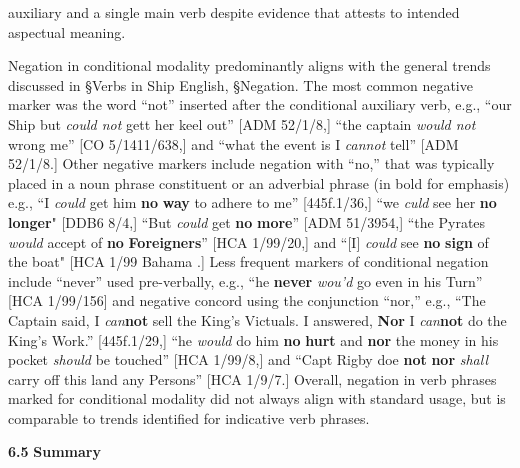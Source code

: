 auxiliary and a single main verb despite evidence that attests to intended aspectual meaning. 

  Negation in conditional modality predominantly aligns with the general trends discussed in §Verbs in Ship English, §Negation. The most common negative marker was the word “not” inserted after the conditional auxiliary verb, e.g., “our Ship but \textit{could not} gett her keel out” [ADM 52/1/8,] “the captain \textit{would not} wrong me” [CO 5/1411/638,] and “what the event is I \textit{cannot} tell” [ADM 52/1/8.] Other negative markers include negation with “no,” that was typically placed in a noun phrase constituent or an adverbial phrase (in bold for emphasis) e.g., “I \textit{could} get him \textbf{no} \textbf{way} to adhere to me” [445f.1/36,] “we \textit{culd} see her \textbf{no} \textbf{longer}" [DDB6 8/4,] “But \textit{could} get \textbf{no} \textbf{more}” [ADM 51/3954,] “the Pyrates \textit{would} accept of \textbf{no} \textbf{Foreigners}” [HCA 1/99/20,] and “[I] \textit{could} see \textbf{no} \textbf{sign} of the boat" [HCA 1/99 Bahama \citealt{Islands1722}.] Less frequent markers of conditional negation include “never” used pre-verbally, e.g., “he \textbf{never} \textit{wou’d} go even in his Turn” [HCA 1/99/156] and negative concord using the conjunction “nor,” e.g., “The Captain said, I \textit{can}\textbf{not} sell the King’s Victuals. I answered, \textbf{Nor} I \textit{can}\textbf{not} do the King’s Work.” [445f.1/29,] “he \textit{would} do him \textbf{no} \textbf{hurt} and \textbf{nor} the money in his pocket \textit{should} be touched” [HCA 1/99/8,] and “Capt Rigby doe \textbf{not} \textbf{nor} \textit{shall} carry off this land any Persons” [HCA 1/9/7.] Overall, negation in verb phrases marked for conditional modality did not always align with standard usage, but is comparable to trends identified for indicative verb phrases. 

\textbf{6.5} \textbf{Summary}

